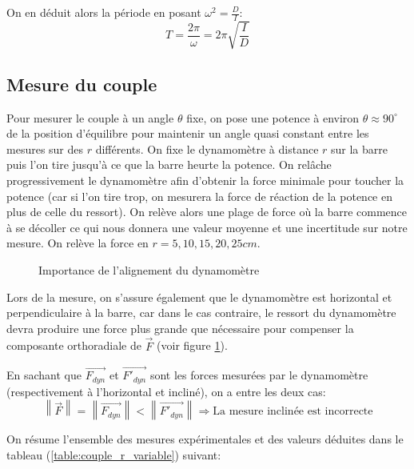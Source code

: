 \documentclass[12pt]{article}
\begin{document}
On en déduit alors la période en posant $\omega^2 = \frac{D}{I}$:
\begin{equation}
    T = \frac{2\pi}{\omega} = 2\pi \sqrt{\frac{I}{D}}
    \label{eqn:periode}
\end{equation}

\subsection{Mesure du couple}
\label{couple_constant}

Pour mesurer le couple à un angle $\theta$ fixe, on pose une potence à environ $\theta \approx 90^{\circ}$ de la position d'équilibre pour maintenir un angle
quasi constant entre les mesures sur des $r$ différents. On fixe le dynamomètre à distance $r$ sur la barre puis l'on tire jusqu'à ce que la barre heurte la potence.
On relâche progressivement le dynamomètre afin d'obtenir la force minimale pour toucher la potence (car si l'on tire trop, on mesurera la force de réaction de la potence en plus de celle du ressort).
On relève alors une plage de force où la barre commence à se décoller ce qui nous donnera une valeur moyenne et une incertitude sur notre mesure. On relève la force en $r=5, 10, 15, 20, 25cm$.

\begin{figure}[!h]
    \begin{center}
        \resizebox{0.5\textwidth}{3cm}{
            
        }
    \end{center}
    \caption{Importance de l'alignement du dynamomètre}
    \label{fig:horizontal}
\end{figure}

Lors de la mesure, on s'assure également que le dynamomètre est horizontal et perpendiculaire à la barre, car dans le cas contraire, le ressort du dynamomètre
devra produire une force plus grande que nécessaire pour compenser la composante orthoradiale de $\vec{F}$ (voir figure \ref{fig:horizontal}).

En sachant que $\vec{F_{dyn}}$ et $\vec{F'_{dyn}}$ sont les forces mesurées par le dynamomètre (respectivement à l'horizontal et incliné), on a entre les deux cas:
\begin{equation}
    \left\lVert \vec{F} \right\rVert = \left\lVert \vec{F_{dyn}} \right\rVert < \left\lVert \vec{F'_{dyn}} \right\rVert \Rightarrow \text{La mesure inclinée est incorrecte}
\end{equation}

On résume l'ensemble des mesures expérimentales et des valeurs déduites dans le tableau (\ref{table:couple_r_variable}) suivant:
\end{document}
